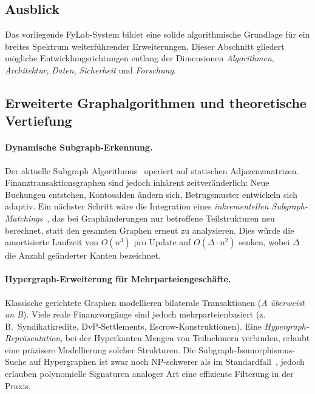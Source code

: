 \documentclass[a4paper,12pt]{article}
\begin{document}
\subsection{Ausblick}

Das vorliegende FyLab-System bildet eine solide algorithmische Grundlage
für ein breites Spektrum weiterführender Erweiterungen.
Dieser Abschnitt gliedert mögliche Entwicklungsrichtungen entlang der
Dimensionen \emph{Algorithmen}, \emph{Architektur}, \emph{Daten},
\emph{Sicherheit} und \emph{Forschung}.

\subsection{Erweiterte Graphalgorithmen und theoretische Vertiefung}
\label{sub:ausblick_algo}

\paragraph{Dynamische Subgraph-Erkennung.}
Der aktuelle Subgraph Algorithmus~\cite{subgraph} operiert auf statischen
Adjazenzmatrizen. Finanztransaktionsgraphen sind jedoch inhärent zeitveränderlich:
Neue Buchungen entstehen, Kontosalden ändern sich, Betrugsmuster entwickeln sich
adaptiv. Ein nächster Schritt wäre die Integration eines
\emph{inkrementellen Subgraph-Matchings}~\cite{cordella2004}, das bei Graphänderungen
nur betroffene Teilstrukturen neu berechnet, statt den gesamten Graphen erneut
zu analysieren. Dies würde die amortisierte Laufzeit von $O(n^3)$ pro Update
auf $O(\Delta \cdot n^2)$ senken, wobei $\Delta$ die Anzahl geänderter Kanten
bezeichnet.

\paragraph{Hypergraph-Erweiterung für Mehrparteiengeschäfte.}
Klassische gerichtete Graphen modellieren bilaterale Transaktionen
(\emph{A überweist an B}). Viele reale Finanzvorgänge sind jedoch mehrparteienbasiert
(z.\,B.\ Syndikatkredite, DvP-Settlements, Escrow-Konstruktionen).
Eine \emph{Hypergraph-Repräsentation}, bei der Hyperkanten Mengen von
Teilnehmern verbinden, erlaubt eine präzisere Modellierung solcher Strukturen.
Die Subgraph-Isomorphismus-Suche auf Hypergraphen ist zwar noch NP-schwerer
als im Standardfall~\cite{garey1979}, jedoch erlauben polynomielle
Signaturen analoger Art eine effiziente Filterung in der Praxis.
\end{document}
